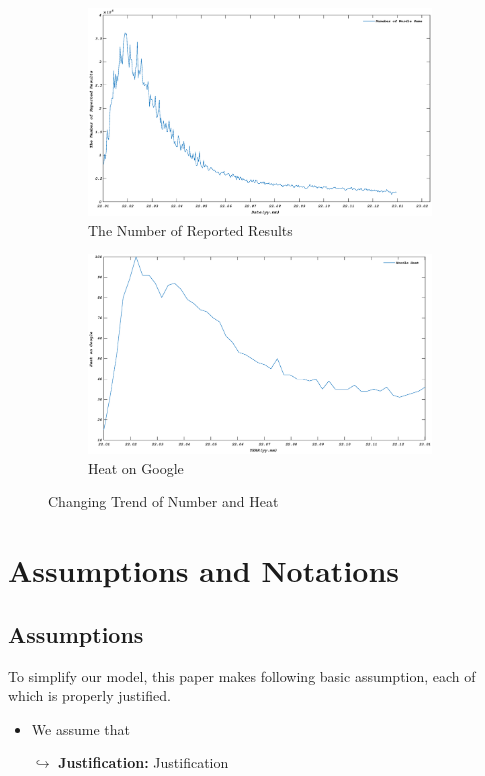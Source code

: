 \documentclass[12pt]{article}  %
\begin{document}
\begin{figure}[htbp]
\centering
\begin{subfigure}[b]{.49\textwidth}
\includegraphics[width=\textwidth]{img/yuanshi.eps}\caption{The Number of Reported Results}
\end{subfigure}
\begin{subfigure}[b]{.49\textwidth}
\includegraphics[width=\textwidth]{img/heat.eps}\caption{Heat on Google}
\end{subfigure}
\caption{Changing Trend of Number and Heat}\label{Changing Trend of Number and Heat}
\end{figure}
\section{Assumptions and Notations}
\subsection{Assumptions}
To simplify our model, this paper makes following basic assumption, each of which is properly
justified.
\begin{itemize}
	\item We assume that

	$\hookrightarrow$ \textbf{Justification:} Justification
\end{itemize}
\end{document}
